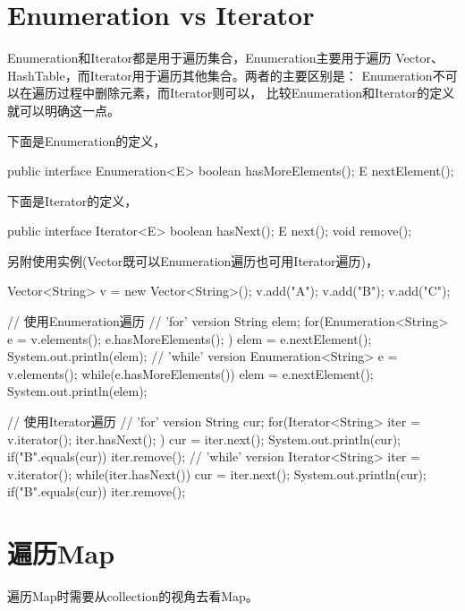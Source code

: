 \section[Enumeration vs Iterator]{Enumeration vs Iterator}
Enumeration和Iterator都是用于遍历集合，Enumeration主要用于遍历
Vector、HashTable，而Iterator用于遍历其他集合。两者的主要区别是：
Enumeration不可以在遍历过程中删除元素，而Iterator则可以，
比较Enumeration和Iterator的定义就可以明确这一点。

下面是Enumeration的定义，

\begin{javacode}
public interface Enumeration<E> {
  boolean hasMoreElements();
  E nextElement();
}
\end{javacode}

下面是Iterator的定义，

\begin{javacode}
public interface Iterator<E> {
  boolean hasNext();
  E next();
  void remove();
}
\end{javacode}

另附使用实例(Vector既可以Enumeration遍历也可用Iterator遍历)，

\begin{javacode}
Vector<String> v = new Vector<String>();
v.add("A");
v.add("B");
v.add("C");

// 使用Enumeration遍历
// 'for' version
String elem;
for(Enumeration<String> e = v.elements(); e.hasMoreElements(); ) {
  elem = e.nextElement();
  System.out.println(elem);
}
// 'while' version
Enumeration<String> e = v.elements();
while(e.hasMoreElements()) {
  elem = e.nextElement();
  System.out.println(elem);
}

// 使用Iterator遍历
// 'for' version
String cur;
for(Iterator<String> iter = v.iterator(); iter.hasNext(); ) {
  cur = iter.next();
  System.out.println(cur);
  if("B".equals(cur)) {
    iter.remove();
  }
}
// 'while' version
Iterator<String> iter = v.iterator();
while(iter.hasNext()) {
  cur = iter.next();
  System.out.println(cur);
  if("B".equals(cur)) {
    iter.remove();
  }
}
\end{javacode}

\section[遍历Map]{遍历Map}
遍历Map时需要从collection的视角去看Map。

